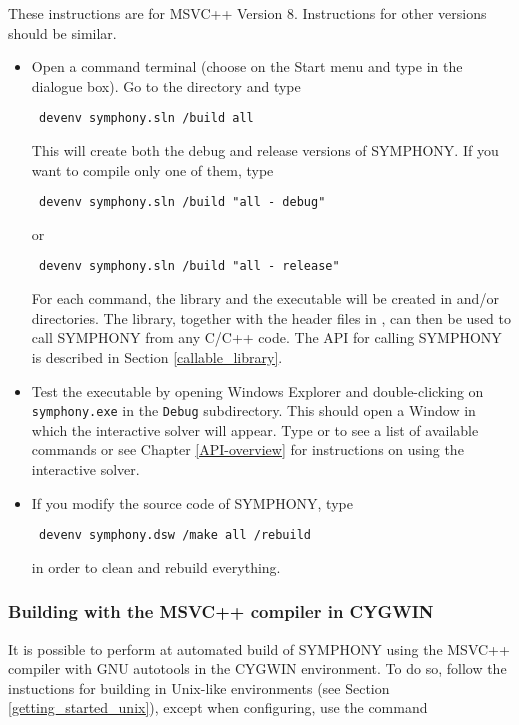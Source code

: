 These instructions are for MSVC++ Version 8. Instructions for other versions
should be similar.

\begin{itemize}
\item Open a command terminal (choose  on the Start menu and type
 in the dialogue box). Go to the 
directory and type 
{\color{Brown}
\begin{verbatim}
 devenv symphony.sln /build all
\end{verbatim}
}
This will create both the debug and release versions of SYMPHONY. If you 
want to compile only one of them, type
{\color{Brown}
\begin{verbatim}
 devenv symphony.sln /build "all - debug"
\end{verbatim}
}
or 
{\color{Brown}
\begin{verbatim}
 devenv symphony.sln /build "all - release"
\end{verbatim}
}
For each command, the library  and the executable 
 will be created in  and/or 
directories.  The library, together with the header files in 
, can then be 
used to call SYMPHONY from any C/C++ code. The API for calling SYMPHONY is 
described in Section \ref{callable_library}.

\item Test the executable by opening Windows Explorer and double-clicking
on {\color{Brown}\texttt{symphony.exe}} in the
{\color{Brown}\texttt{Debug\bs}} subdirectory. This should open a Window in
which the interactive solver will appear. Type  or  to see
a list of available commands or see Chapter
\ref{API-overview} for instructions on using the interactive solver.

\item If you modify the source code of SYMPHONY, type 
{\color{Brown}
\begin{verbatim}
 devenv symphony.dsw /make all /rebuild
\end{verbatim}
}
in order to clean and rebuild everything.
\end{itemize} 

\subsubsection{Building with the MSVC++ compiler in CYGWIN}

It is possible to perform at automated build of SYMPHONY using the MSVC++
compiler  with GNU autotools in the CYGWIN environment. To do so,
follow the instuctions for building in Unix-like environments (see Section
\ref{getting_started_unix}), except when configuring, use the command

